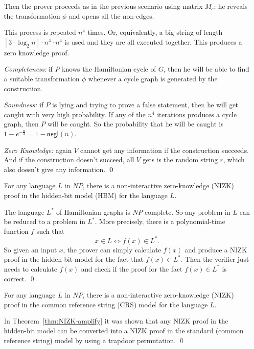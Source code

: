 Then the prover proceeds as in the previous scenario using matrix $M_c$: he
reveals the transformation $\phi$ and opens all the non-edges.

This process is repeated $n^4$ times. Or, equivalently, a big string of length
$\left\lceil 3\cdot \log_2 n\right\rceil \cdot n^4\cdot n^4$ is used and they are all
executed together. This produces a zero knowledge proof.

\textit{Completeness:} if $P$ knows the Hamiltonian cycle of $G$,
then he will be able to find a suitable transformation $\phi$ whenever a cycle graph is
generated by the construction.

\textit{Soundness:} if $P$ is lying and trying to prove a false statement, then he will
get caught with very high probability. If any of the $n^4$ iterations produces a cycle
graph, then $P$ will be caught. So the probability that he will be caught is
$1-e^{-\frac{n}{3}} = 1-\mathsf{negl}(n)$.

\textit{Zero Knowledge:} again $V$ cannot get any information if the construction succeeds.
And if the construction doesn't succeed, all $V$ gets is the random string $r$, which also
doesn't give any information.
\qed


\begin{theorem}
For any language $L$ in $NP$, there is a non-interactive zero-knowledge (NIZK) proof
in the hidden-bit model (HBM) for the language $L$.
\end{theorem}
\proof
The language $L^*$ of Hamiltonian graphs is $NP$-complete. So any problem in $L$ can
be reduced to a problem in $L^*$. More precisely, there is a polynomial-time function
$f$ such that
$$x\in L \Longleftrightarrow f(x)\in L^*.$$
So given an input $x$, the prover can simply calculate $f(x)$ and
produce a NIZK proof in the hidden-bit model for the fact that $f(x)\in L^*$.
Then the verifier just needs to calculate $f(x)$ and check if the proof for the fact
$f(x)\in L^*$ is correct.
\qed

\begin{theorem}\label{the:NIZK_NP}
For any language $L$ in $NP$, there is a non-interactive zero-knowledge (NIZK) proof
in the common reference string (CRS) model for the language $L$.
\end{theorem}
\proof
In Theorem~\ref{thm:NIZK-amplify} it was shown that any NIZK proof in the hidden-bit model can
be converted into a NIZK proof in the standard (common reference string) model by using
a trapdoor permutation.
\qed

